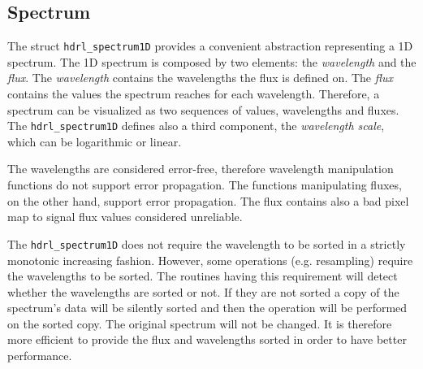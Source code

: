 \subsection{Spectrum}
The struct \verb+hdrl_spectrum1D+ provides a convenient abstraction representing a 1D spectrum. The 1D spectrum is composed by two elements: the \textit{wavelength} and the \textit{flux}. The \textit{wavelength} contains the wavelengths the flux is defined on. The \textit{flux} contains the values the spectrum reaches for each wavelength. Therefore, a spectrum can be visualized as two sequences of values, wavelengths and fluxes. The  \verb+hdrl_spectrum1D+ defines also a third component, the \textit{wavelength scale}, which can be logarithmic or linear.

The wavelengths are considered error-free, therefore wavelength manipulation functions do not support error propagation. The functions manipulating fluxes, on the other hand, support error propagation. The flux contains also a bad pixel map to signal flux values considered unreliable.

The \verb+hdrl_spectrum1D+ does not require the wavelength to be sorted in a strictly monotonic increasing fashion. However, some operations (e.g. resampling) require the wavelengths to be sorted. The routines having this requirement will detect whether the wavelengths are sorted or not. If they are not sorted a copy of the spectrum's data will be silently sorted and then the operation will be performed on the sorted copy. The original spectrum will not be changed. It is therefore more efficient to provide the flux and wavelengths sorted in order to have better performance.

